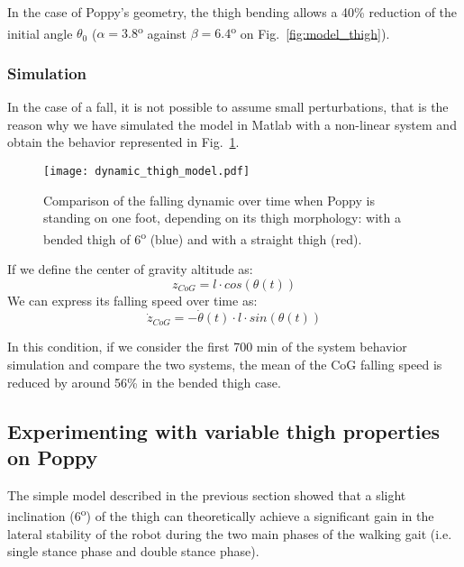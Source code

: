 In the case of Poppy's geometry, the thigh bending allows a 40\% reduction of the initial angle $\theta_0$ ($\alpha = 3.8$\textsuperscript{o} against $ \beta = 6.4$\textsuperscript{o} on Fig.~\ref{fig:model_thigh}).

\subsubsection{Simulation} %

In the case of a fall, it is not possible to assume small perturbations, that is the reason why we have simulated the model in Matlab with a non-linear system and obtain the behavior represented in Fig.~\ref{fig:dynamic_thigh_model}.

\begin{figure}[thpb]
    \centering
    \texttt{[image: dynamic\_thigh\_model.pdf]}
    \caption{Comparison of the falling dynamic over time when Poppy is standing on one foot, depending on its thigh morphology: with a bended thigh of 6\textsuperscript{o} (blue) and with a straight thigh (red).}
    \label{fig:dynamic_thigh_model}
\end{figure}

If we define the center of gravity altitude as:
\begin{equation}
    z_{CoG} = l \cdot cos(\theta(t))
\end{equation}
We can express its falling speed over time as:
\begin{equation}
    \dot{z}_{CoG} = - \dot{\theta}(t) \cdot l \cdot sin(\theta(t))
\end{equation}

In this condition, if we consider the first 700 min of the system behavior simulation and compare the two systems, the mean of the CoG falling speed is reduced by around 56\% in the bended thigh case.


\subsection{Experimenting with variable thigh properties on Poppy} %

The simple model described in the previous section showed that a slight inclination (6\textsuperscript{o}) of the thigh can theoretically achieve a significant gain in the lateral stability of the robot during the two main phases of the walking gait (i.e. single stance phase and double stance phase).

